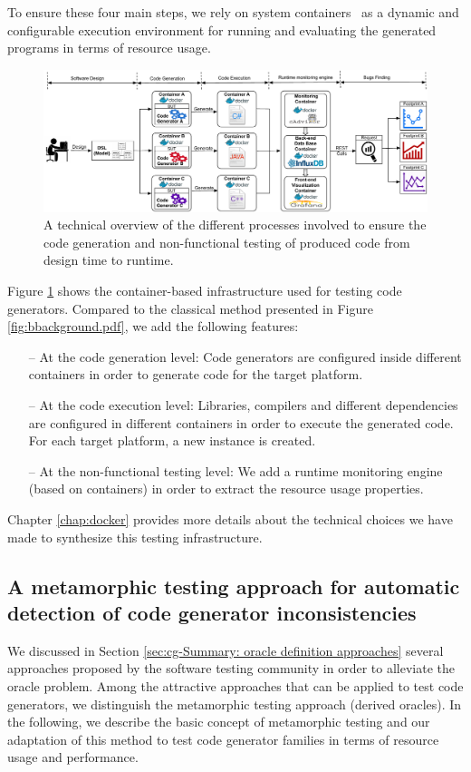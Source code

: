 To ensure these four main steps, we rely on system containers~\cite{soltesz2007container} as a dynamic and configurable execution environment for running and evaluating the generated programs in terms of resource usage.

\begin{figure}[h]
	\center
	\includegraphics[width=1.\linewidth]{chapitre5/fig/docker_background2.pdf}
	\caption{A technical overview of the different processes involved to ensure the code generation and non-functional testing of produced code from design time to runtime.}
	\label{fig:cg-infra}
\end{figure}

Figure \ref{fig:cg-infra} shows the container-based infrastructure used for testing code generators. Compared to the classical method presented in Figure \ref{fig:bbackground.pdf}, we add the following features: 
\begin{itemize}
	\item[--] At the code generation level: Code generators are configured inside different containers in order to generate code for the target platform.
	\item[--] At the code execution level: Libraries, compilers and different dependencies are configured in different containers in order to execute the generated code. For each target platform, a new instance is created.
	\item[--] At the non-functional testing level: We add a runtime monitoring engine (based on containers) in order to extract the resource usage properties.
\end{itemize}

Chapter \ref{chap:docker} provides more details about the technical choices we have made to synthesize this testing infrastructure.

\subsection{A metamorphic testing approach for automatic detection of code generator inconsistencies}
We discussed in Section \ref{sec:cg-Summary: oracle definition approaches} several approaches proposed by the software testing community in order to alleviate the oracle problem. Among the attractive approaches that can be applied to test code generators, we distinguish the metamorphic testing approach (derived oracles). In the following, we describe the basic concept of metamorphic testing and our adaptation of this method to test code generator families in terms of resource usage and performance.

